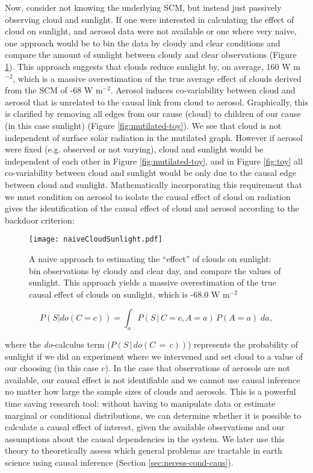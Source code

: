 \documentclass[12pt]{article}
\begin{document}
Now, consider not knowing the underlying SCM, but instead just
passively observing cloud and sunlight. If one were interested in
calculating the effect of cloud on sunlight, and aerosol data were not
available or one where very naive, one approach would be to bin the
data by cloudy and clear conditions and compare the amount of sunlight
between cloudy and clear observations (Figure
\ref{fig:naive-cloud-sunlight}). This approach suggests that clouds
reduce sunlight by, on average, 160 W m$^{-2}$, which is a massive
overestimation of the true average effect of clouds derived from the
SCM of -68 W m$^{-2}$. Aerosol induces co-variability between cloud
and aerosol that is unrelated to the causal link from cloud to
aerosol. Graphically, this is clarified by removing all edges from our
cause (cloud) to children of our cause (in this case sunlight) (Figure
\ref{fig:mutilated-toy}). We see that cloud is not independent of
surface solar radiation in the mutilated graph.  However if aerosol
were fixed (e.g. observed or not varying), cloud and sunlight would be
independent of each other in Figure \ref{fig:mutilated-toy}, and
in Figure \ref{fig:toy} all co-variability between cloud and sunlight
would be only due to the causal edge between cloud and sunlight.
Mathematically incorporating this requirement that we must condition
on aerosol to isolate the causal effect of cloud on radiation gives
the identification of the causal effect of cloud and aerosol according
to the backdoor criterion:

\begin{figure}
  \texttt{[image: naiveCloudSunlight.pdf]}
  \caption{A naive approach to estimating the ``effect'' of clouds on
    sunlight: bin observations by cloudy and clear day, and compare
    the values of sunlight. This approach yields a massive
    overestimation of the true causal effect of clouds on sunlight,
    which is -68.0 W m$^{-2}$}
  \label{fig:naive-cloud-sunlight}
\end{figure}

\begin{equation}
  P(S | do(C = c)) = \int_{a} P(S \, | \, C = c,
  A=a) \, P(A=a) \; da,
  \label{eq:3}
\end{equation}

where the \textit{do}-calculus \citep{pearl2009} term
($P(S \, | \, do(C\, = \,c))$) represents the probability of sunlight
if we did an experiment where we intervened and set cloud to a value
of our choosing (in this case $c$). In the case that observations of
aerosols are not available, our causal effect is not identifiable and
we cannot use causal inference no matter how large the sample sizes of
clouds and aerosols. This is a powerful time saving research tool:
without having to manipulate data or estimate marginal or conditional
distributions, we can determine whether it is possible to calculate a
causal effect of interest, given the available observations and our
assumptions about the causal dependencies in the system.  We later use
this theory to theoretically assess which general problems are
tractable in earth science using causal inference (Section
\ref{sec:necess-cond-caus}).
\end{document}
